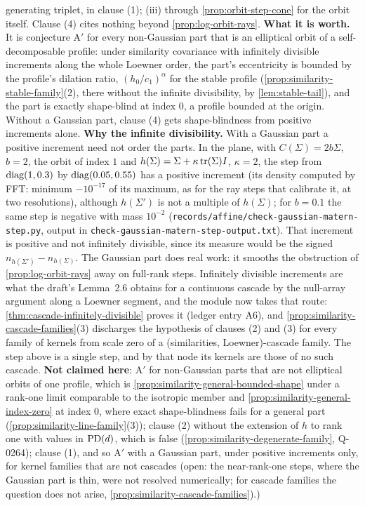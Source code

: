 \begin{proposition}
{generating triplet, in clause (1); (iii) through \ref{prop:orbit-step-cone} for the
orbit itself. Clause (4) cites nothing beyond \ref{prop:log-orbit-rays}. \textbf{What it is worth.}
It is conjecture A$'$ for every non-Gaussian part that is an elliptical orbit of a self-decomposable
profile: under similarity covariance with infinitely divisible increments along the whole Loewner
order, the part's eccentricity is bounded by the profile's dilation ratio, $(h_0/c_1)^\alpha$ for the
stable profile (\ref{prop:similarity-stable-family}(2), there without the infinite divisibility, by
\ref{lem:stable-tail}), and the part is exactly shape-blind at index $0$, a profile bounded at the
origin. Without a Gaussian part, clause (4) gets shape-blindness from positive increments alone.
\textbf{Why the infinite divisibility.} With a Gaussian part a positive increment need not order the
parts. In the plane, with $C(\Sigma) = 2b\Sigma$, $b = 2$, the \Matern{} orbit of index $1$ and
$h(\Sigma) = \Sigma + \kappa\operatorname{tr}(\Sigma)I$, $\kappa = 2$, the step from $\operatorname{diag}(1, 0.3)$ by
$\operatorname{diag}(0.05, 0.55)$ has a positive increment (its density computed by FFT: minimum $-10^{-17}$ of its
maximum, as for the ray steps that calibrate it, at two resolutions), although $h(\Sigma')$ is not a
multiple of $h(\Sigma)$; for $b = 0.1$ the same step is negative with mass $10^{-2}$
(\texttt{records/affine/check-gaussian-matern-step.py}, output in \texttt{check-gaussian-matern-step-output.txt}). That increment is
positive and not infinitely divisible, since its \Levy{} measure would be the signed
$n_{h(\Sigma')} - n_{h(\Sigma)}$. The Gaussian part does real work: it smooths the obstruction of
\ref{prop:log-orbit-rays} away on full-rank steps. Infinitely divisible increments are what the
draft's Lemma~2.6 obtains for a continuous cascade by the null-array argument along a Loewner segment,
and the module now takes that route: \ref{thm:cascade-infinitely-divisible} proves it (ledger entry
A6), and \ref{prop:similarity-cascade-families}(3) discharges the hypothesis of clauses (2) and (3) for
every family of kernels from scale zero of a (similarities, Loewner)-cascade family. The step above is a
single step, and by that node its kernels are those of no such cascade.
\textbf{Not claimed here}: A$'$ for non-Gaussian parts that are not elliptical orbits of one profile,
which is \ref{prop:similarity-general-bounded-shape} under a rank-one limit comparable to the isotropic
member and \ref{prop:similarity-general-index-zero} at index $0$, where exact shape-blindness fails for a
general part (\ref{prop:similarity-line-family}(3)); clause (2) without the extension of $h$ to rank
one with values in $\mathrm{PD}(d)$, which is false (\ref{prop:similarity-degenerate-family}, Q-0264);
clause (1), and so A$'$ with a Gaussian part, under positive increments only, for kernel families
that are not cascades (open: the near-rank-one steps, where the Gaussian part is thin, were not
resolved numerically; for cascade families the question does not arise,
\ref{prop:similarity-cascade-families}).)}
\end{proposition}

